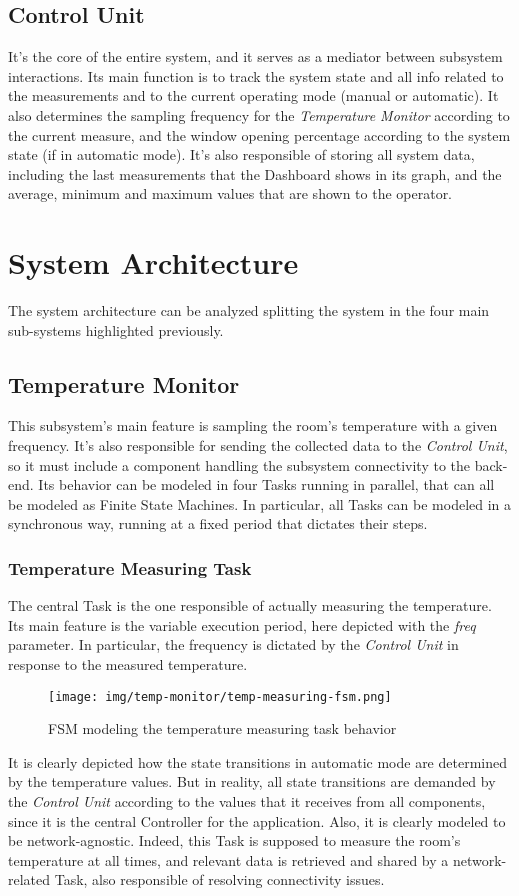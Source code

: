 \documentclass[a4paper,12pt]{report}
\begin{document}
	\section{Control Unit}
	It's the core of the entire system, and it serves as a mediator between subsystem interactions. Its main function is to track the system state and all info related to the measurements and to the current operating mode (manual or automatic). It also determines the sampling frequency for the \textit{Temperature Monitor} according to the current measure, and the window opening percentage according to the system state (if in automatic mode). It's also responsible of storing all system data, including the last measurements that the Dashboard shows in its graph, and the average, minimum and maximum values that are shown to the operator.
	
	\chapter{System Architecture}
	The system architecture can be analyzed splitting the system in the four main sub-systems highlighted previously.
	\section{Temperature Monitor}
	This subsystem's main feature is sampling the room's temperature with a given frequency. It's also responsible for sending the collected data to the \textit{Control Unit}, so it must include a component handling the subsystem connectivity to the back-end.
	\newline Its behavior can be modeled in four Tasks running in parallel, that can all be modeled as Finite State Machines. In particular, all Tasks can be modeled in a synchronous way, running at a fixed period that dictates their steps.
		\subsection{Temperature Measuring Task}
		The central Task is the one responsible of actually measuring the temperature. Its main feature is the variable execution period, here depicted with the \textit{freq} parameter. In particular, the frequency is dictated by the \textit{Control Unit} in response to the measured temperature.
		\begin{figure}[H]
			\centering{}
			\texttt{[image: img/temp-monitor/temp-measuring-fsm.png]}
			\caption{FSM modeling the temperature measuring task behavior}
			\label{img:temp-monitor/temp-measuring-fsm}
		\end{figure}
		It is clearly depicted how the state transitions in automatic mode are determined by the temperature values. But in reality, all state transitions are demanded by the \textit{Control Unit} according to the values that it receives from all components, since it is the central Controller for the application.
		\newline Also, it is clearly modeled to be network-agnostic. Indeed, this Task is supposed to measure the room's temperature at all times, and relevant data is retrieved and shared by a network-related Task, also responsible of resolving connectivity issues.
\end{document}
